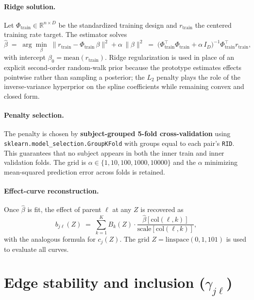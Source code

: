 \documentclass[11pt]{article}
\newcommand{\code}[1]{\texttt{#1}}
\begin{document}
\paragraph{Ridge solution.} Let
$\Phi_{\text{train}} \in \mathbb{R}^{n \times D}$ be the standardized
training design and $r_{\text{train}}$ the centered training rate target.
The estimator solves
\begin{equation}
\hat{\beta} \;=\; \arg\min_{\beta} \;\bigl\lVert r_{\text{train}} - \Phi_{\text{train}}\,\beta \bigr\rVert^2 + \alpha\,\lVert \beta \rVert^2 \;=\; \bigl(\Phi_{\text{train}}^\top \Phi_{\text{train}} + \alpha\, I_D\bigr)^{-1} \Phi_{\text{train}}^\top r_{\text{train}},
\label{eq:ridge}
\end{equation}
with intercept $\beta_0 = \mathrm{mean}(r_{\text{train}})$. Ridge
regularization is used in place of an explicit second-order random-walk
prior because the prototype estimates effects pointwise rather than
sampling a posterior; the $L_2$ penalty plays the role of the
inverse-variance hyperprior on the spline coefficients while remaining
convex and closed form.

\paragraph{Penalty selection.} The penalty is chosen by
\textbf{subject-grouped 5-fold cross-validation} using
\code{sklearn.model\_selection.GroupKFold} with groups equal to each pair's
\code{RID}. This guarantees that no subject appears in both the inner train
and inner validation folds. The grid is
$\alpha \in \{1, 10, 100, 1000, 10000\}$ and the $\alpha$ minimizing
mean-squared prediction error across folds is retained.

\paragraph{Effect-curve reconstruction.} Once $\hat{\beta}$ is fit, the
effect of parent $\ell$ at any $Z$ is recovered as
\begin{equation}
b_{j\ell}(Z) \;=\; \sum_{k=1}^{K} B_k(Z) \cdot \frac{\hat{\beta}[\mathrm{col}(\ell,k)]}{\mathrm{scale}[\mathrm{col}(\ell,k)]},
\label{eq:effect}
\end{equation}
with the analogous formula for $c_j(Z)$. The grid
$Z = \mathrm{linspace}(0,1,101)$ is used to evaluate all curves.

\section{Edge stability and inclusion (\texorpdfstring{$\gamma_{j\ell}$}{gamma})}
\label{sec:stability}
\end{document}
